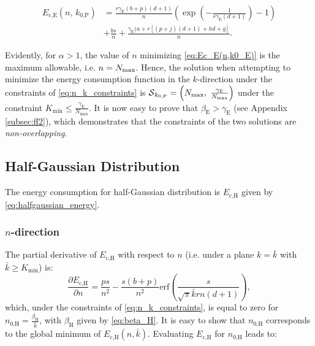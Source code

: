 \documentclass[twocolumn,english]{IEEEtran}
\theoremstyle{plain}
\theoremstyle{definition}
\begin{document}
\begin{align}
E_{\text{c,E}}(n,\, k_{\text{0,P}}) & =\frac{r\gamma_{\textrm{E}}(b+p)(d+1)}{n}\left(\exp\left(-\frac{1}{r\gamma_{\textrm{E}}(d+1)}\right)-1\right)\nonumber \\
 & +\frac{bs}{n}+\frac{\gamma_{\textrm{E}}(a+r\left[\left(p+j\right)\left(d+1\right)+hd+g\right]}{n}.\label{eq:Ec_E(n,k0_E)}
\end{align}


\noindent Evidently, for $\alpha>1$, the value of $n$ minimizing
\eqref{eq:Ec_E(n,k0_E)} is the maximum allowable, i.e. $n=N_{\textnormal{max}}$.
Hence, the solution when attempting to minimize the energy consumption
function in the $k$-direction under the constraints of \eqref{eq:n_k_constraints}
is $\text{\ensuremath{\mathcal{S}}}_{k_{0,\text{P}}}=\left(N_{\text{max}},\;\frac{\gamma_{\textrm{E}}}{N_{\text{max}}}\right)$
under the constraint $K_{\min}\leq\frac{\gamma_{\textrm{E}}}{N_{\textrm{max}}}$.
It is now easy to prove that $\beta_{\text{E}}>\gamma_{\textrm{E}}$
(see Appendix \ref{subsec:ff2}), which demonstrates that the constraints
of the two solutions are \emph{non-overlapping}.


\subsection{Half-Gaussian Distribution\label{sub:Appendix-Half-Gaussian}}

The energy consumption for half-Gaussian distribution is $E_{\text{c,H}}$
given by \eqref{eq:halfgaussian_energy}.


\subsubsection{$n$-direction}

The partial derivative of $E_{\text{c,H}}$ with respect to $n$ (i.e.
under a plane $k=\bar{k}$ with $\bar{k}\geq K_{\min}$) is: 
\begin{equation}
\frac{\partial E_{\text{c,H}}}{\partial n}=\frac{ps}{n^{2}}-\frac{s\left(b+p\right)}{n^{2}}\text{erf}\left(\frac{s}{\sqrt{\pi}\bar{k}rn(d+1)}\right),
\end{equation}
which, under the constraints of \ref{eq:n_k_constraints}, is equal
to zero for $n_{\text{0,H}}=\frac{\beta_{\text{H}}}{\bar{k}}$, with
$\beta_{\text{H}}$ given by \eqref{eq:beta_H}. It is easy to show
that $n_{\text{0,H}}$ corresponds to the global minimum of $E_{\text{c,H}}\left(n,\bar{k}\right)$.
Evaluating $E_{\text{c,H}}$ for $n_{\text{0,H}}$ leads to:
\end{document}
